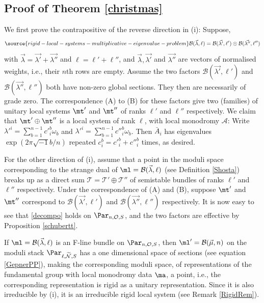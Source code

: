 \subsection{Proof of Theorem \ref{christmas}}
We first prove the  contrapositive of  the reverse direction in (i): Suppose,
\begin{equation}\label{decompo}
\source{rigid-local-systems-multiplicative-eigenvalue-problem}
\mathcal{B}(\vec{\lambda},\ell)=\mathcal{B}(\vec{\lambda'},\ell')\otimes \mathcal{B}(\vec{\lambda''},\ell'')
\end{equation}
with $\vec{\lambda}=\vec{\lambda'}+\vec{\lambda''}$ and $\ell=\ell'+\ell''$, and $\vec{\lambda},\vec{\lambda'}$ and $\vec{\lambda''}$ are vectors of  normalised weights, i.e., their $n$th rows are empty.   Assume the two factors $\mathcal{B}(\vec{\lambda'},\ell')$ and $\mathcal{B}(\vec{\lambda''},\ell'')$ both have non-zero global sections. They then are necessarily of grade zero. The correspondence (A) to (B) for these factors give two (families) of unitary local systems $\mt'$ and $\mt''$ of ranks $\ell'$ and $\ell''$ respectively. We claim that $\mt'\oplus\mt''$ is a local system of rank $\ell$, with local monodromy $\mathcal{A}$: Write $\lambda'^i=\sum_{b=1}^{n-1} c'^b_i\omega_b$ and $\lambda'^i=\sum_{b=1}^{n-1} c''^b_i\omega_b$. Then $\bar{A}_i$ has eigenvalues $\exp(2\pi \sqrt{-1}b/n)$ repeated $c^b_i=c'^b_i+c''^b_i$ times, as desired.

For the other direction of (i), assume that a point in the moduli space corresponding to the strange dual of $\ml=\mathcal{B}(\vec{\lambda},\ell)$ (see Definition \ref{Shosta})  breaks up as a direct sum $\mathcal{T}=\mathcal{T}'\oplus \mathcal{T}''$ of semistable bundles of ranks $\ell'$ and $\ell''$ respectively. Under the correspondence of (A) and (B), suppose $\mt'$ and $\mt''$ correspond to $\mathcal{B}(\vec{\lambda'}, \ell')$  and $\mathcal{B}(\vec{\lambda''}, \ell'')$ respectively. It is now easy to see that
\eqref{decompo} holds on $\Par_{n,\mathcal{O},S}$, and the two factors are effective by Proposition  \ref{schubertt}.


If $\ml=\mathcal{B}(\vec{\lambda},\ell)$ is an F-line bundle on   $\Par_{n,\mathcal{O},S}$, then $\ml'=\mathcal{B}(\vec{\mu},n)$ on the moduli stack  $\Par_{\ell,\widetilde{\mathcal{N}},S}$ has a one dimensional space of sections (see equation \ref{GepnerPP}), making the corresponding moduli space, of representations of the fundamental group with local monodromy data $\ma$, a point, i.e., the corresponding representation is rigid as a unitary representation. Since it is also irreducible by (i), it is an irreducible rigid local system (see Remark \ref{RigidRem}).

